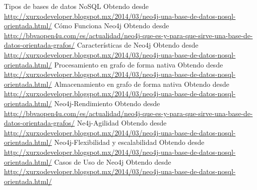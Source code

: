 \begin{thebibliography}{1}
    Tipos de bases de datos NoSQL Obtendo desde \url{http://xurxodeveloper.blogspot.mx/2014/03/neo4j-una-base-de-datos-nosql-orientada.html/}	
    Cómo Funciona Neo4j Obtendo desde \url{http://bbvaopen4u.com/es/actualidad/neo4j-que-es-y-para-que-sirve-una-base-de-datos-orientada-grafos/}
    Características de Neo4j Obtendo desde \url{http://xurxodeveloper.blogspot.mx/2014/03/neo4j-una-base-de-datos-nosql-orientada.html/}	
    Procesamiento en grafo de forma nativa Obtendo desde \url{http://xurxodeveloper.blogspot.mx/2014/03/neo4j-una-base-de-datos-nosql-orientada.html/}	
    Almacenamiento en grafo de forma nativa Obtendo desde \url{http://xurxodeveloper.blogspot.mx/2014/03/neo4j-una-base-de-datos-nosql-orientada.html/}	
    Neo4j-Rendimiento Obtendo desde \url{http://bbvaopen4u.com/es/actualidad/neo4j-que-es-y-para-que-sirve-una-base-de-datos-orientada-grafos/}	
   	 Ne4j-Agilidad Obtendo desde \url{http://xurxodeveloper.blogspot.mx/2014/03/neo4j-una-base-de-datos-nosql-orientada.html/}	
    Neo4j-Flexibilidad y escalabilidad Obtendo desde \url{http://xurxodeveloper.blogspot.mx/2014/03/neo4j-una-base-de-datos-nosql-orientada.html/}
    Casos de Uso de Neo4j Obtendo desde \url{http://xurxodeveloper.blogspot.mx/2014/03/neo4j-una-base-de-datos-nosql-orientada.html/}	
\end{thebibliography}
